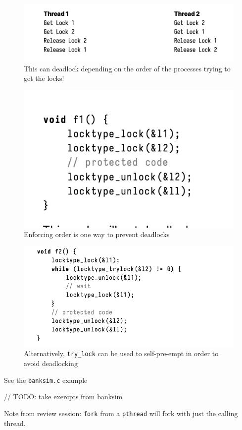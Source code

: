\documentclass[../notes.tex]{subfiles}
\begin{document}
\begin{figure}[H]
    \centering
    \includegraphics[width=0.8\linewidth]{img/image_2023-03-08-14-58-38.png}
    \caption{This can deadlock depending on the order of the processes trying to get the locks!}
\end{figure}


\begin{figure}[H]
    \centering
    \includegraphics[width=0.8\linewidth]{img/image_2023-03-08-14-59-08.png}
    \caption{Enforcing order is one way to prevent deadlocks}
\end{figure}


\begin{figure}[H]
    \centering
    \includegraphics[width=0.8\linewidth]{img/image_2023-03-08-14-59-23.png}
    \caption{Alternatively, \texttt{try\_lock} can be used to self-pre-empt in order to avoid deadlocking}
\end{figure}


See the \texttt{banksim.c} example


// TODO: take exercpts from banksim


\begin{blockquote}
    Note from review session: \texttt{fork} from a \texttt{pthread} will fork with just the calling thread.
\end{blockquote}
\end{document}
